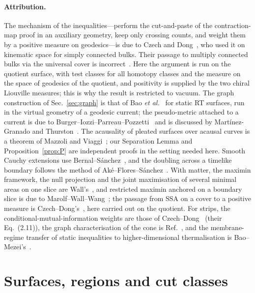 \documentclass[aps,prd,onecolumn,superscriptaddress,nofootinbib,amsmath,amssymb,11pt]{revtex4-2}
\theoremstyle{definition}
\begin{document}
\paragraph*{Attribution.} The mechanism of the inequalities---perform the cut-and-paste of the contraction-map
proof in an auxiliary geometry, keep only crossing counts, and weight them by a positive measure on
geodesics---is due to Czech and Dong~\cite{CzechDong2019}, who used it on kinematic space for simply connected
bulks. Their passage to multiply connected bulks via the universal cover is incorrect~\cite{GGHH2025}. Here the
argument is run on the quotient surface, with test classes for all homotopy classes and the measure on the space
of geodesics of the quotient, and positivity is supplied by the two chiral Liouville measures; this is why the
result is restricted to vacuum. The graph construction of Sec.~\ref{sec:graph} is that of Bao
\emph{et al.}~\cite{Bao2015} for static RT surfaces, run in the virtual geometry of a geodesic current; the
pseudo-metric attached to a current is due to Burger--Iozzi--Parreau--Pozzetti~\cite{BIPP2021} and is
discussed by Mart\'inez-Granado and Thurston~\cite{MartinezGranadoThurston2026}. The acausality of pleated
surfaces over acausal curves is a theorem of Mazzoli and Viaggi~\cite{MazzoliViaggi2022}; our Separation Lemma
and Proposition~\ref{prop:P} are independent proofs in the setting needed here. Smooth Cauchy extensions use
Bernal--S\'anchez~\cite{BernalSanchez2006}, and the doubling across a timelike boundary follows the method of
Ak\'e--Flores--S\'anchez~\cite{AkeFloresSanchez2021}. With matter, the maximin framework, the null projection and the
joint maximisation of several minimal areas on one slice are Wall's~\cite{Wall2014}, and restricted maximin anchored on a
boundary slice is due to Marolf--Wall--Wang~\cite{MarolfWallWang2019}; the passage from SSA on a cover to a positive measure
is Czech--Dong's~\cite{CzechDong2019}, here carried out on the quotient. For strips, the conditional-mutual-information weights
are those of Czech--Dong~\cite{CzechDong2019} (their Eq.~(2.11)), the graph characterisation of the cone is
Ref.~\cite{Bao2015}, and the membrane-regime transfer of static inequalities to higher-dimensional thermalisation is
Bao--Mezei's~\cite{BaoMezei2018}.

\section{Surfaces, regions and cut classes}\label{sec:setting}
\end{document}
